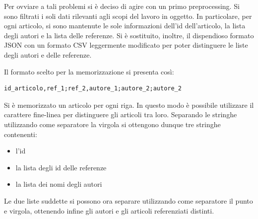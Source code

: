 \documentclass[a4paper, 12pt]{article}
\begin{document}
Per ovviare a tali problemi si è deciso di agire con un primo preprocessing. Si sono filtrati i soli dati rilevanti agli scopi del lavoro in oggetto. In particolare, per ogni articolo, si sono mantenute le sole informazioni dell'id dell'articolo, la lista degli autori e la lista delle referenze. Si è sostituito, inoltre, il dispendioso formato JSON con un formato CSV leggermente modificato per poter distinguere le liste degli autori e delle referenze.
\par
Il formato scelto per la memorizzazione si presenta così:
\begin{lstlisting}[keepspaces=true]
id_articolo,ref_1;ref_2,autore_1;autore_2;autore_2
\end{lstlisting}
Si è memorizzato un articolo per ogni riga. In questo modo è possibile utilizzare il carattere fine-linea per distinguere gli articoli tra loro.
Separando le stringhe utilizzando come separatore la virgola si ottengono dunque tre stringhe contenenti:
\begin{itemize}
  \item l'id
  \item la lista degli id delle referenze
  \item la lista dei nomi degli autori
\end{itemize}
Le due liste suddette si possono ora separare utilizzando come separatore il punto e virgola, ottenendo infine gli autori e gli articoli referenziati distinti.
\end{document}

